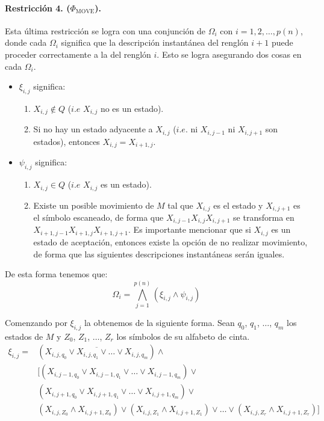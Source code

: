 \documentclass[a4paper]{article}
\begin{document}
\paragraph{Restricción 4. ($\Phi_{\text{MOVE}}$).}

Esta última restricción se logra con una conjunción de $\Omega_i$ con $i = 1,2,\dots,p(n)$, donde cada $\Omega_i$ significa que la descripción instantánea del renglón $i+1$ puede proceder correctamente a la del renglón $i$. Esto se logra asegurando dos cosas en cada $\Omega_i$.

\begin{itemize}
  \item $\xi_{i,j}$ significa:
  \begin{enumerate}
    \item $X_{i,j} \not \in Q$ ($i.e$ $X_{i,j}$ no es un estado).
    \item Si no hay un estado adyacente a $X_{i,j}$ ($i.e.$ ni $X_{i,j-1}$ ni $X_{i,j+1}$ son estados), entonces $X_{i,j}=X_{i+1,j}$.
  \end{enumerate}
  \item $\psi_{i,j}$ significa:
  \begin{enumerate}
    \item $X_{i,j} \in Q$ ($i.e$ $X_{i,j}$ es un estado).
    \item Existe un posible movimiento de $M$ tal que $X_{i,j}$ es el estado y $X_{i,j+1}$ es el símbolo escaneado, de forma que $X_{i,j-1} X_{i,j} X_{i,j+1}$ se transforma en $X_{i+1,j-1} X_{i+1,j} X_{i+1,j+1}$. Es importante mencionar que si $X_{i,j}$ es un estado de aceptación, entonces existe la opción de no realizar movimiento, de forma que las siguientes descripciones instantáneas serán iguales.
  \end{enumerate}
\end{itemize}

De esta forma tenemos que:
$$\Omega_i = \bigwedge_{j=1}^{p(n)}\left(\xi_{i,j}\land\psi_{i,j}\right)$$

Comenzando por $\xi_{i,j}$ la obtenemos de la siguiente forma.
Sean $q_0$, $q_1$, $\dots$, $q_m$ los estados de $M$ y $Z_0$, $Z_1$, $\dots$, $Z_r$ los símbolos de su alfabeto de cinta.
\begin{align*}
  \xi_{i,j}=
  &(\overline{X_{i,j,q_0} \lor X_{i,j,q_1} \lor\dots\lor X_{i,j,q_m}}) \land\\
  &[(X_{i,j-1,q_0} \lor X_{i,j-1,q_1} \lor\dots\lor X_{i,j-1,q_m}) \lor\\
  &(X_{i,j+1,q_0} \lor X_{i,j+1,q_1} \lor\dots\lor X_{i,j+1,q_m}) \lor\\
  &(X_{i,j,Z_0}\land X_{i,j+1,Z_0})\lor(X_{i,j,Z_1}\land X_{i,j+1,Z_1})\lor\dots\lor
  (X_{i,j,Z_r}\land X_{i,j+1,Z_r})]
\end{align*}
\end{document}

